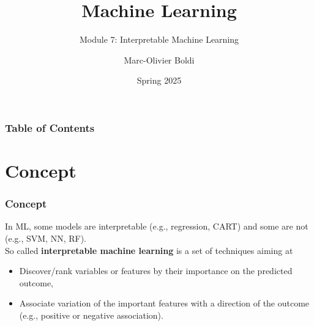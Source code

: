 
\title{Machine Learning}
\subtitle{Module 7: Interpretable Machine Learning}
\author[MOB]{Marc-Olivier Boldi}
\date{Spring 2025}

\begin{frame}
  \titlepage
\end{frame}
\begin{frame}
\frametitle{Table of Contents}
	\tableofcontents
\end{frame}
\section{Concept}
\begin{frame}
\frametitle{Concept}
In ML, some models are interpretable (e.g., regression, CART) and some are not (e.g., SVM, NN, RF). \\
\vspace{0.3cm}
So called {\bf interpretable machine learning} is a set of techniques aiming at
\begin{itemize}
\item Discover/rank variables or features by their importance on the predicted outcome,
\item Associate variation of the important features with a direction of the outcome (e.g., positive or negative association).
\end{itemize}
\end{frame}
